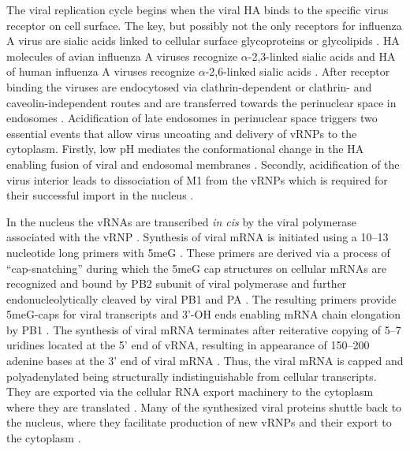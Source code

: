 	The viral replication cycle begins when the viral \gls{HA} binds to the specific virus receptor on cell surface. The key, but possibly not the only receptors for influenza A virus are sialic acids linked to cellular surface glycoproteins or glycolipids \parencite{Skehel2000, Stray2000, Martin1998}. \gls{HA} molecules of avian influenza A viruses recognize $\alpha$-2,3-linked sialic acids and \gls{HA} of human influenza A viruses recognize $\alpha$-2,6-linked sialic acids \parencite{Connor1994, VanRiel2010}. After receptor binding the viruses are endocytosed via clathrin-dependent or clathrin- and caveolin-independent routes and are transferred towards the perinuclear space in endosomes \parencite{Dourmashkin1974, Matlin1981, Sieczkarski2002, Lakadamyali2003}. Acidification of late endosomes in perinuclear space triggers two essential events that allow virus uncoating and delivery of \gls{vRNP}s to the cytoplasm. Firstly, low pH mediates the conformational change in the \gls{HA} enabling fusion of viral and endosomal membranes \parencite{Carr1993}. Secondly, acidification of the virus interior leads to dissociation of \gls{M1} from the \gls{vRNP}s which is required for their successful import in the nucleus \parencite{Bui1996}. 
	
	In the nucleus the \gls{vRNA}s are transcribed \textit{in cis} by the viral polymerase associated with the \gls{vRNP} \parencite{Moeller2012}. Synthesis of viral mRNA is initiated using a 10--13 nucleotide long primers with \gls{5meG} \parencite{Beaton1981, Plotch1981a}. These primers are derived via a process of ``cap-snatching'' during which the \gls{5meG} cap structures on cellular mRNAs are recognized and bound by \gls{PB2} subunit of viral polymerase \parencite{Guilligay2008} and further endonucleolytically cleaved by viral \gls{PB1} and \gls{PA} \parencite{Li2001, Dias2009, Yuan2009}. The resulting primers provide \gls{5meG}-caps for viral transcripts and 3'-OH ends enabling mRNA chain elongation by \gls{PB1} \parencite{Poch1989}. The synthesis of viral mRNA terminates after reiterative copying of 5--7 uridines located at the 5' end of vRNA, resulting in appearance of 150--200 adenine bases at the 3' end of viral mRNA \parencite{Plotch1977, Robertson1981d, Poon1999}. Thus, the viral mRNA is capped and polyadenylated being structurally indistinguishable from cellular transcripts. They are exported via the cellular RNA export machinery to the cytoplasm where they are translated \parencite{Chen2000}. Many of the synthesized viral proteins  shuttle back to the nucleus, where they facilitate production of new \gls{vRNP}s and their export to the cytoplasm \parencite{Greenspan1988, Neumann1997, Huet2010, Wang2013}. 
	
